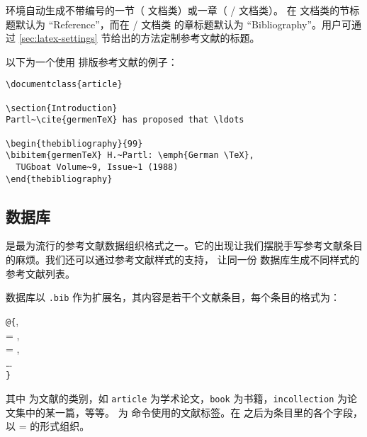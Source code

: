  环境自动生成不带编号的一节（ 文档类）或一章（ /  文档类）。
在  文档类的节标题默认为 ``Reference''{}，而在  /  文档类
的章标题默认为 ``Bibliography''{}。用户可通过 \ref{sec:latex-settings} 节给出的方法定制参考文献的标题。

以下为一个使用  排版参考文献的例子：
\begin{verbatim}
\documentclass{article}

\section{Introduction}
Partl~\cite{germenTeX} has proposed that \ldots

\begin{thebibliography}{99}
\bibitem{germenTeX} H.~Partl: \emph{German \TeX},
  TUGboat Volume~9, Issue~1 (1988)
\end{thebibliography}

\end{verbatim}

\subsection{ 数据库}\label{subsec:bibtex-data}

 是最为流行的参考文献数据组织格式之一。它的出现让我们摆脱手写参考文献条目的麻烦。我们还可以通过参考文献样式的支持，
让同一份  数据库生成不同样式的参考文献列表。

 数据库以 \texttt{.bib} 作为扩展名，其内容是若干个文献条目，每个条目的格式为：
\begin{command}
\texttt @\texttt\{, \\
\qquad{} = , \\
\qquad{} = , \\
\qquad\ldots\\
\texttt\}
\end{command}

其中  为文献的类别，如 \texttt{article} 为学术论文，\texttt{book} 为书籍，\texttt{in\-collection} 为论文集中的某一篇，等等。
 为  命令使用的文献标签。在  之后为条目里的各个字段，以  =  的形式组织。

